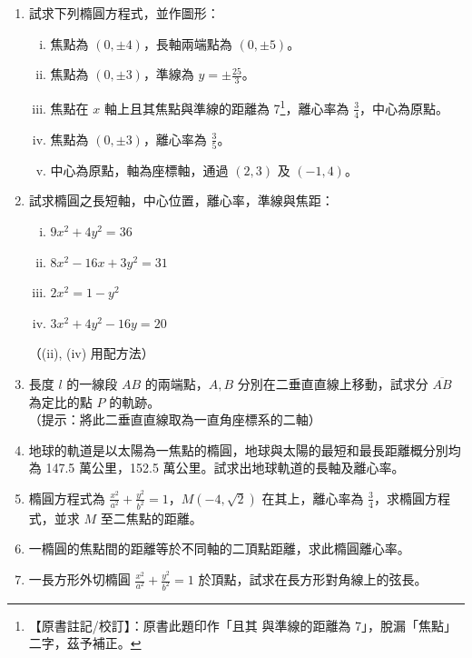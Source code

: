\begin{enumerate}
  \item 試求下列橢圓方程式，並作圖形：
  \begin{enumerate}[(i)]
    \item 焦點為 $(0, \pm 4)$，長軸兩端點為 $(0, \pm 5)$。
    \item 焦點為 $(0, \pm 3)$，準線為 $y = \pm \frac{25}{3}$。
    \item 焦點在 $x$ 軸上且其焦點與準線的距離為 7\label{note:b4s-ch3-ex1-1-3}\footnote{【原書註記/校訂】：原書此題印作「且其 與準線的距離為 7」，脫漏「焦點」二字，茲予補正。}，離心率為 $\frac{3}{4}$，中心為原點。
    \item 焦點為 $(0, \pm 3)$，離心率為 $\frac{3}{5}$。
    \item[*(\roman{enumii})] 中心為原點，軸為座標軸，通過 $(2,3)$ 及 $(-1,4)$。
  \end{enumerate}

  \item 試求橢圓之長短軸，中心位置，離心率，準線與焦距：
  \begin{enumerate}[(i)]
    \item $9x^2 + 4y^2 = 36$
    \item $8x^2 - 16x + 3y^2 = 31$
    \item $2x^2 = 1 - y^2$
    \item $3x^2 + 4y^2 - 16y = 20$
  \end{enumerate}
  （(ii), (iv) 用配方法）

  \item 長度 $l$ 的一線段 $AB$ 的兩端點，$A, B$ 分別在二垂直直線上移動，試求分 $\overline{AB}$ 為定比的點 $P$ 的軌跡。\\
  （提示：將此二垂直直線取為一直角座標系的二軸）

  \item 地球的軌道是以太陽為一焦點的橢圓，地球與太陽的最短和最長距離概分別均為 147.5 萬公里，152.5 萬公里。試求出地球軌道的長軸及離心率。

  \item[*\theenumi.] 橢圓方程式為 $\frac{x^2}{a^2} + \frac{y^2}{b^2} = 1$，$M(-4,\sqrt{2})$ 在其上，離心率為 $\frac{3}{4}$，求橢圓方程式，並求 $M$ 至二焦點的距離。

  \item 一橢圓的焦點間的距離等於不同軸的二頂點距離，求此橢圓離心率。

  \item 一長方形外切橢圓 $\frac{x^2}{a^2} + \frac{y^2}{b^2} = 1$ 於頂點，試求在長方形對角線上的弦長。


\end{enumerate}
